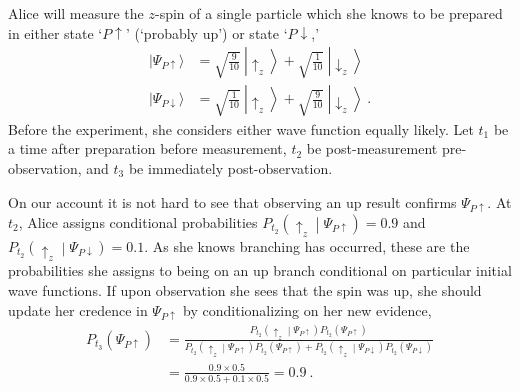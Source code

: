 \documentclass[onecolumn,secnumarabic,amsmath,amssymb,balancelastpage,nofootinbib]{article}
\begin{document}
\begin{description}[font=\normalfont\scshape]
\item[What Wave Function?] Alice will measure the $z$-spin of a single particle which she knows to be prepared in either state `$P\!\uparrow$' (`probably up') or state `$P\!\downarrow$,'
\begin{align}
|\Psi_{P\uparrow}\rangle &= \sqrt{\frac{9}{10}}\:\left|\uparrow_z\right\rangle+\sqrt{\frac{1}{10}}\:\left|\downarrow_z\right\rangle
\nonumber
\\
|\Psi_{P\downarrow}\rangle &= \sqrt{\frac{1}{10}}\:\left|\uparrow_z\right\rangle+\sqrt{\frac{9}{10}}\:\left|\downarrow_z\right\rangle\ .
\label{whatwf}
\end{align}
Before the experiment, she considers either wave function equally likely.  Let $t_1$ be a time after preparation before measurement, $t_2$ be post-measurement pre-observation, and $t_3$ be immediately post-observation.
\end{description}
On our account it is not hard to see that observing an up result confirms $\Psi_{P\uparrow}$.  At $t_2$, Alice assigns conditional probabilities $P_{t_2}\left(\uparrow_z\middle|\Psi_{P\uparrow}\right)=0.9$ and $P_{t_2}\left(\uparrow_z\middle|\Psi_{P\downarrow}\right)=0.1$.  As she knows branching has occurred, these are the probabilities she assigns to being on an up branch conditional on particular initial wave functions.  If upon observation she sees that the spin was up, she should update her credence in $\Psi_{P\uparrow}$ by conditionalizing on her new evidence,
\begin{align}
P_{t_3}\left(\Psi_{P\uparrow}\right)&=\frac{P_{t_2}\left(\uparrow_z\middle|\Psi_{P\uparrow}\right)P_{t_2}\left(\Psi_{P\uparrow}\right)}{P_{t_2}\left(\uparrow_z\middle|\Psi_{P\uparrow}\right)P_{t_2}\left(\Psi_{P\uparrow}\right)+P_{t_2}\left(\uparrow_z\middle|\Psi_{P\downarrow}\right)P_{t_2}\left(\Psi_{P\downarrow}\right)}
\nonumber
\\
&=\frac{0.9 \times 0.5}{0.9 \times 0.5+0.1 \times 0.5}=0.9\ .
\label{updating}
\end{align}
\end{document}
